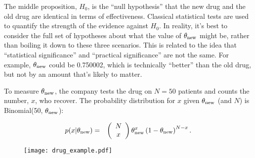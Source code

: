 \documentclass[a4paper, 12pt]{article}
\begin{document}
The middle proposition, $H_0$,
is the ``null hypothesis'' that the new drug and the
old drug are identical in terms of effectiveness. Classical statistical tests
are used to quantify the strength of the evidence against $H_0$. In reality,
it's best to consider the full set of hypotheses about what the value of
$\theta_{\rm new}$ might be, rather than boiling it down to these three
scenarios. This is related to the idea
that ``statistical significance'' and ``practical significance'' are not the
same. For example, $\theta_{\rm new}$ could be 0.750002, which is
technically ``better'' than the old drug, but not by an amount that's likely
to matter.

To measure $\theta_{\rm new}$, the company tests the drug on $N=50$ patients
and counts the number, $x$, who recover. The probability distribution for
$x$ given $\theta_{\rm new}$ (and $N$) is Binomial(50, $\theta_{\rm new}$):

\begin{eqnarray}
p(x | \theta_{\rm new}) &=&
\left(\begin{array}{cc}N \\ x\end{array}\right)
\theta_{\rm new}^x \left(1 - \theta_{\rm new}\right)^{N - x}.
\end{eqnarray}

\begin{figure}[ht!]
\centering
\texttt{[image: drug\_example.pdf]}
\caption{\label{fig:drug_example}}
\end{figure}
\end{document}
